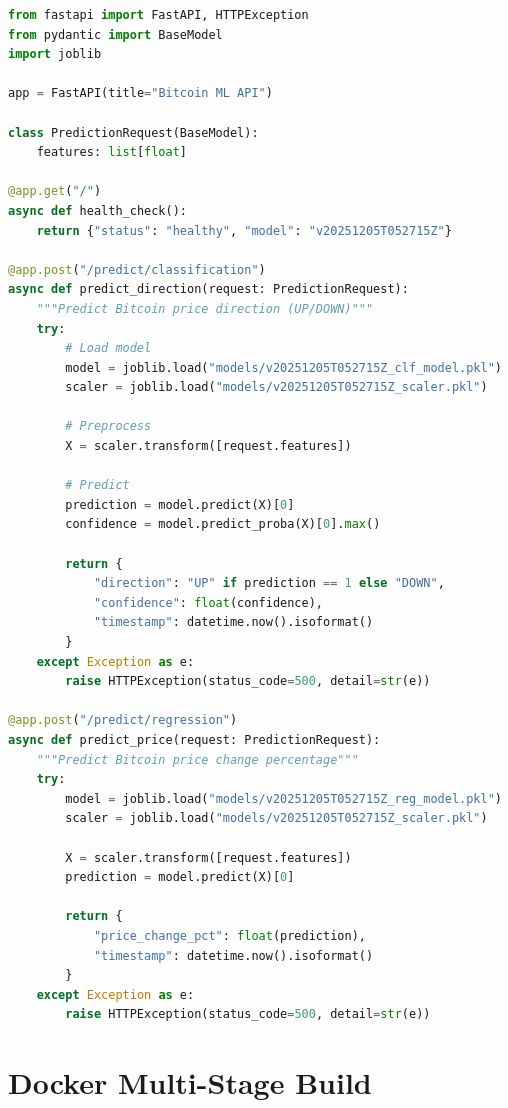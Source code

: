 \begin{lstlisting}[language=Python, caption={FastAPI Prediction Endpoint}]
from fastapi import FastAPI, HTTPException
from pydantic import BaseModel
import joblib

app = FastAPI(title="Bitcoin ML API")

class PredictionRequest(BaseModel):
    features: list[float]

@app.get("/")
async def health_check():
    return {"status": "healthy", "model": "v20251205T052715Z"}

@app.post("/predict/classification")
async def predict_direction(request: PredictionRequest):
    """Predict Bitcoin price direction (UP/DOWN)"""
    try:
        # Load model
        model = joblib.load("models/v20251205T052715Z_clf_model.pkl")
        scaler = joblib.load("models/v20251205T052715Z_scaler.pkl")
        
        # Preprocess
        X = scaler.transform([request.features])
        
        # Predict
        prediction = model.predict(X)[0]
        confidence = model.predict_proba(X)[0].max()
        
        return {
            "direction": "UP" if prediction == 1 else "DOWN",
            "confidence": float(confidence),
            "timestamp": datetime.now().isoformat()
        }
    except Exception as e:
        raise HTTPException(status_code=500, detail=str(e))

@app.post("/predict/regression")
async def predict_price(request: PredictionRequest):
    """Predict Bitcoin price change percentage"""
    try:
        model = joblib.load("models/v20251205T052715Z_reg_model.pkl")
        scaler = joblib.load("models/v20251205T052715Z_scaler.pkl")
        
        X = scaler.transform([request.features])
        prediction = model.predict(X)[0]
        
        return {
            "price_change_pct": float(prediction),
            "timestamp": datetime.now().isoformat()
        }
    except Exception as e:
        raise HTTPException(status_code=500, detail=str(e))
\end{lstlisting}

\section{Docker Multi-Stage Build}

